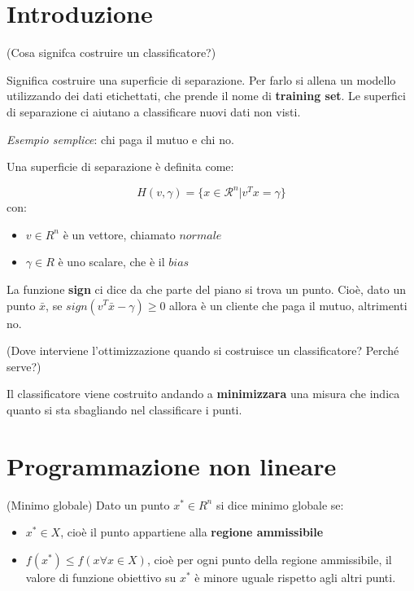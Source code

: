 \section{Introduzione}

\begin{domanda}
    (Cosa signifca costruire un classificatore?)

    Significa costruire una superficie di separazione. Per farlo si allena un
    modello utilizzando dei dati etichettati, che prende il nome di
    \textbf{training set}. Le superfici di separazione ci aiutano a classificare
    nuovi dati non visti.

    \textit{Esempio semplice}: chi paga il mutuo e chi no.
\end{domanda}

Una superficie di separazione è definita come:

$$ H(v,\gamma) = \{x \in \mathcal{R}^n | v^T x = \gamma\} $$
con:
\begin{itemize}
    \item $v \in R^n$ è un vettore, chiamato $normale$
    \item $\gamma \in R$ è uno scalare, che è il $bias$
\end{itemize}

La funzione \textbf{sign} ci dice da che parte del piano si trova un punto.
Cioè, dato un punto $\bar{x}$, se $sign(v^T \bar{x} - \gamma) \geq 0$ allora è
un cliente che paga il mutuo, altrimenti no.

\begin{domanda}
    (Dove interviene l'ottimizzazione quando si costruisce un classificatore? Perché serve?)

    Il classificatore viene costruito andando a \textbf{minimizzara} una misura che
    indica quanto si sta sbagliando nel classificare i punti.
\end{domanda}

\section{Programmazione non lineare}

\begin{definition}
    (Minimo globale)
    Dato un punto $x^* \in R^n$ si dice minimo globale se:
    \begin{itemize}
        \item $x^* \in X$, cioè il punto appartiene alla \textbf{regione ammissibile}
        \item $f(x^*) \leq f(x \forall x \in X)$, cioè per ogni punto della regione ammissibile, il valore di funzione obiettivo su $x^*$ è minore uguale rispetto agli altri punti.
    \end{itemize}
\end{definition}

